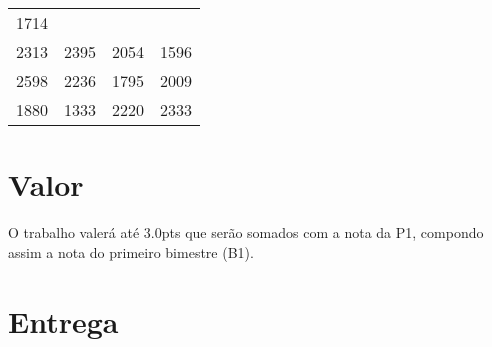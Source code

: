 \documentclass[a4paper]{article}
\begin{document}
\begin{longtable}[c]{@{}cccc@{}}
\begin{minipage}[t]{0.06\columnwidth}
1714
\strut\end{minipage}\tabularnewline
\begin{minipage}[t]{0.06\columnwidth}\centering\strut
2313
\strut\end{minipage} &
\begin{minipage}[t]{0.06\columnwidth}\centering\strut
2395
\strut\end{minipage} &
\begin{minipage}[t]{0.06\columnwidth}\centering\strut
2054
\strut\end{minipage} &
\begin{minipage}[t]{0.06\columnwidth}\centering\strut
1596
\strut\end{minipage}\tabularnewline
\begin{minipage}[t]{0.06\columnwidth}\centering\strut
2598
\strut\end{minipage} &
\begin{minipage}[t]{0.06\columnwidth}\centering\strut
2236
\strut\end{minipage} &
\begin{minipage}[t]{0.06\columnwidth}\centering\strut
1795
\strut\end{minipage} &
\begin{minipage}[t]{0.06\columnwidth}\centering\strut
2009
\strut\end{minipage}\tabularnewline
\begin{minipage}[t]{0.06\columnwidth}\centering\strut
1880
\strut\end{minipage} &
\begin{minipage}[t]{0.06\columnwidth}\centering\strut
1333
\strut\end{minipage} &
\begin{minipage}[t]{0.06\columnwidth}\centering\strut
2220
\strut\end{minipage} &
\begin{minipage}[t]{0.06\columnwidth}\centering\strut
2333
\strut\end{minipage}\tabularnewline
\bottomrule
\end{longtable}

\section{Valor}
O trabalho valerá até $3.0$pts que serão somados com a nota da P1, compondo assim a nota do primeiro bimestre (B1).

\section{Entrega}
\end{document}
